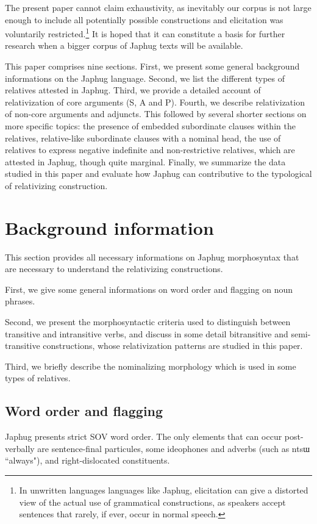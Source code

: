 \documentclass[oldfontcommands,oneside,a4paper,11pt]{article}
\newcommand{\ipa}[1]{{\phon #1}} %
\begin{document}
The present paper  cannot claim exhaustivity, as inevitably our corpus is not large enough to include all potentially possible constructions and elicitation was voluntarily restricted.\footnote{In unwritten languages languages like Japhug, elicitation can give a distorted view of the actual use of grammatical constructions, as speakers accept sentences that rarely, if ever, occur in normal speech.  }  It is hoped that it can constitute a basis for further research when a bigger corpus of Japhug texts will be available.

This paper comprises nine sections. First, we present some general background informations on the Japhug language. Second, we list the different types of relatives attested in Japhug. Third, we provide a detailed account of relativization of core arguments (S, A and P). Fourth, we describe relativization of non-core arguments and adjuncts. This followed by several shorter sections on more specific topics: the presence of embedded subordinate clauses within the relatives, relative-like subordinate clauses with a nominal head, the use of relatives to express negative indefinite and non-restrictive relatives, which are attested in Japhug, though quite marginal. Finally, we summarize the data studied in this paper and evaluate how Japhug can contributive to the typological of relativizing construction.
 
 

 


\section{Background information}
This section provides all necessary informations on Japhug morphosyntax that are necessary to understand the relativizing constructions. 

First, we give some general informations on word order and flagging on noun phrases.

Second, we present the morphosyntactic criteria used to distinguish between transitive and intransitive verbs, and discuss in some detail bitransitive and semi-transitive constructions, whose relativization patterns are studied in this paper.

Third, we briefly describe the nominalizing morphology which is used in some types of relatives.
\subsection{Word order and flagging}
Japhug presents strict SOV word order. The only elements that can occur post-verbally are sentence-final particules, some ideophones and adverbs (such as \ipa{ntsɯ} ``always"), and right-dislocated constituents.
\end{document}
